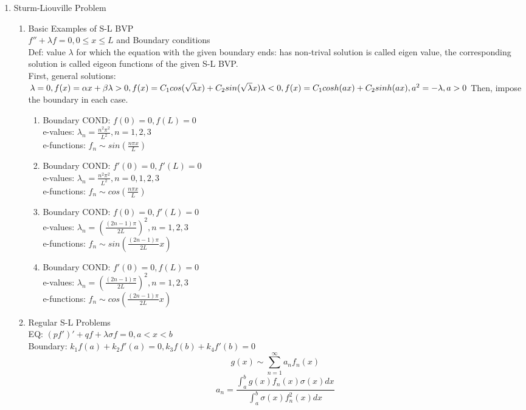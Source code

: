 \documentclass[10pt]{article}
\begin{document}
\begin{multicols}{2}
\begin{enumerate}
	\item Sturm-Liouville Problem
		\begin{enumerate}
			\item Basic Examples of S-L BVP\\
			$f'' + \lambda f = 0, 0\le x \le L$ and Boundary conditions\\
			Def: value $\lambda$ for which the equation with the given boundary ends: has non-trival solution is called eigen value, the corresponding solution is called eigeon functions of the given S-L BVP.\\
			First, general solutions:\\
			$\lambda = 0, f(x) = \alpha x + \beta\\
			\lambda > 0, f(x) = C_1 cos(\sqrt{\lambda}x) + C_2 sin(\sqrt{\lambda}x)\\
			\lambda < 0, f(x) = C_1 cosh(ax) + C_2 sinh(ax), a^2 = -\lambda, a > 0$
			Then, impose the boundary in each case.
			\begin{enumerate}
				\item Boundary COND: $f(0) = 0, f(L) = 0$\\
				e-values: $\lambda_n = \frac{n^2\pi^2}{L^2}, n = 1,2,3$\\
				e-functions: $f_n \sim sin(\frac{n \pi x}{L})$
				\item Boundary COND: $f'(0) = 0, f'(L) = 0$\\
				e-values: $\lambda_n = \frac{n^2\pi^2}{L^2}, n = 0,1,2,3$\\
				e-functions: $f_n \sim cos(\frac{n \pi x}{L})$
				\item Boundary COND: $f(0) = 0, f'(L) = 0$\\
				e-values: $\lambda_n = (\frac{(2n-1)\pi}{2L})^2, n = 1,2,3$\\
				e-functions: $f_n \sim sin(\frac{(2n-1)\pi}{2L}x)$
				\item Boundary COND: $f'(0) = 0, f(L) = 0$\\
				e-values: $\lambda_n = (\frac{(2n-1)\pi}{2L})^2, n = 1,2,3$\\
				e-functions: $f_n \sim cos(\frac{(2n-1)\pi}{2L}x)$
			\end{enumerate}
			\item Regular S-L Problems\\
				EQ: $(pf')' + qf + \lambda \sigma f = 0, a < x < b$\\
				Boundary: $k_1f(a) + k_2f'(a) = 0, k_3f(b) + k_4f'(b) = 0$\\
				$$g(x) \sim \sum_{n=1}^{\infty}a_n f_n(x) $$
				$$a_n = \frac{\int_{a}^{b}g(x)f_n(x)\sigma (x)dx}{\int_{a}^{b}\sigma(x) f_n^2(x)dx}$$
			

\end{enumerate}
\end{enumerate}
\end{multicols}
\end{document}
